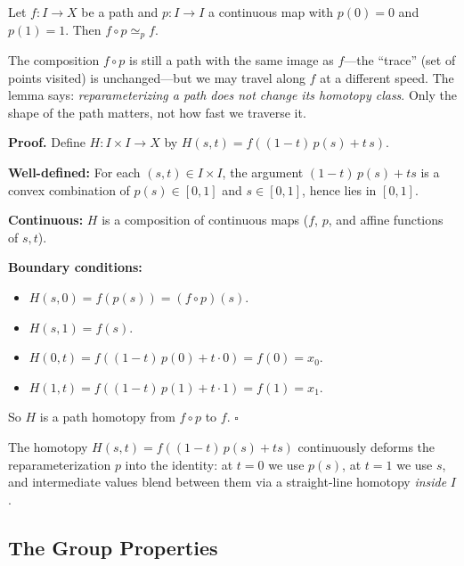 \documentclass[11pt]{report}
\renewenvironment{proof}[1][Proof]{\noindent\textbf{#1.} }{\hfill$\square$\par\vspace{5pt}}
\begin{document}
\begin{lembox}[Reparameterization]
Let $f: I \to X$ be a path and $p: I \to I$ a continuous map with $p(0) = 0$ and $p(1) = 1$. Then $f \circ p \simeq_p f$.
\end{lembox}

\begin{rembox}
The composition $f \circ p$ is still a path with the same image as $f$---the ``trace'' (set of points visited) is unchanged---but we may travel along $f$ at a different speed. The lemma says: \emph{reparameterizing a path does not change its homotopy class}. Only the shape of the path matters, not how fast we traverse it.
\end{rembox}

\begin{proof}
Define $H: I \times I \to X$ by $H(s, t) = f((1 - t)\,p(s) + t\,s)$.

\textbf{Well-defined:} For each $(s, t) \in I \times I$, the argument $(1-t)\,p(s) + ts$ is a convex combination of $p(s) \in [0,1]$ and $s \in [0,1]$, hence lies in $[0,1]$.

\textbf{Continuous:} $H$ is a composition of continuous maps ($f$, $p$, and affine functions of $s, t$).

\textbf{Boundary conditions:}
\begin{itemize}[nosep]
    \item $H(s, 0) = f(p(s)) = (f \circ p)(s)$. \checkmark
    \item $H(s, 1) = f(s)$. \checkmark
    \item $H(0, t) = f((1-t)\,p(0) + t \cdot 0) = f(0) = x_0$. \checkmark
    \item $H(1, t) = f((1-t)\,p(1) + t \cdot 1) = f(1) = x_1$. \checkmark
\end{itemize}
So $H$ is a path homotopy from $f \circ p$ to $f$.
\end{proof}

\begin{rembox}
The homotopy $H(s, t) = f((1-t)\,p(s) + ts)$ continuously deforms the reparameterization $p$ into the identity: at $t = 0$ we use $p(s)$, at $t = 1$ we use $s$, and intermediate values blend between them via a straight-line homotopy \emph{inside} $I$.
\end{rembox}

\subsection{The Group Properties}
\end{document}

